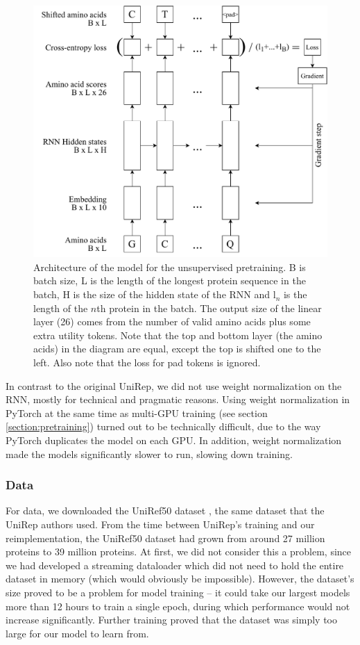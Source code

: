 \documentclass[a4paper,12pt]{article}
\begin{document}
\begin{figure}
    \centering
    \includegraphics[width = \linewidth]{figures/pretraining_diagram.pdf}
    \caption{Architecture of the model for the unsupervised pretraining. B is batch size, L is the length of the longest protein sequence in the batch, H is the size of the hidden state of the RNN and $\text{l}_n$ is the length of the $n$th protein in the batch. The output size of the linear layer (26) comes from the number of valid amino acids plus some extra utility tokens. Note that the top and bottom layer (the amino acids) in the diagram are equal, except the top is shifted one to the left. Also note that the loss for pad tokens is ignored.}
    \label{fig:pretrain_arch}
\end{figure}

In contrast to the original UniRep, we did not use weight normalization on the RNN, mostly for technical and pragmatic reasons. Using weight normalization in PyTorch at the same time as multi-GPU training (see section \ref{section:pretraining}) turned out to be technically difficult, due to the way PyTorch duplicates the model on each GPU. In addition, weight normalization made the models significantly slower to run, slowing down training.

\subsubsection{Data}
\label{section:reproduction_data}
For data, we downloaded the UniRef50 dataset \cite{uniprot}, the same dataset that the UniRep authors used. From the time between UniRep's training and our reimplementation, the UniRef50 dataset had grown from around 27 million proteins to 39 million proteins. At first, we did not consider this a problem, since we had developed a streaming dataloader which did not need to hold the entire dataset in memory (which would obviously be impossible). However, the dataset's size proved to be a problem for model training -- it could take our largest models more than 12 hours to train a single epoch, during which performance would not increase significantly. Further training proved that the dataset was simply too large for our model to learn from.
\end{document}

